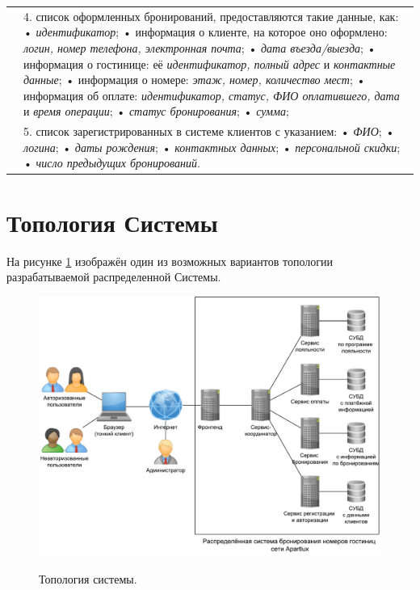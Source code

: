 \begin{longtable}{|p{0.5cm}|p{15.5cm}|}
	&
	4. список оформленных бронирований, предоставляются такие данные, как: \newline
	• \textit{идентификатор}; \newline
	• информация о клиенте, на которое оно оформлено: \textit{логин, номер телефона, электронная почта}; \newline
	• \textit{дата въезда/выезда}; \newline
	• информация о гостинице: её \textit{идентификатор, полный адрес} и \textit{контактные данные}; \newline
	• информация о номере: \textit{этаж, номер, количество мест}; \newline	
	• информация об оплате: \textit{идентификатор, статус, ФИО оплатившего, дата} и \textit{время операции}; \newline
	• \textit{статус бронирования}; \newline
	• \textit{сумма}; \\
	\cline{2-2}
	
	&
	5. список зарегистрированных в системе клиентов с указанием: \newline
	• \textit{ФИО}; \newline
	• \textit{логина}; \newline
 	• \textit{даты рождения}; \newline
	• \textit{контактных данных}; \newline
	• \textit{персональной скидки}; \newline
	• \textit{число предыдущих бронирований}. \\
	\hline
\end{longtable}

\section*{Топология Системы}
На рисунке \ref{fig:topology} изображён один из возможных вариантов  топологии разрабатываемой распределенной Системы.
\begin{figure}[h]
	\begin{center}
		{\includegraphics[scale = 0.6]{img/pic/topology.pdf}}
		\caption{Топология системы.}
		\label{fig:topology}
	\end{center}
\end{figure}

